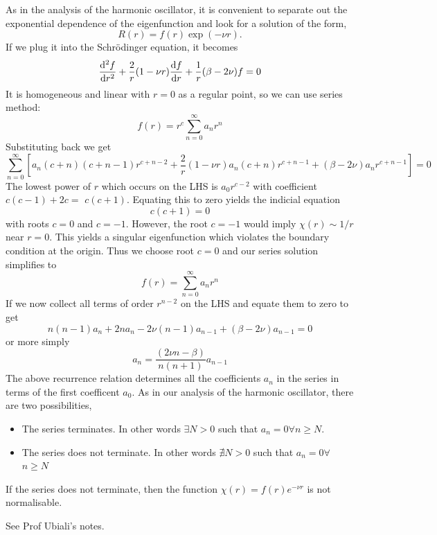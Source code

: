 \documentclass[a4paper]{article}
\begin{document}
As in the analysis of the harmonic oscillator, it is convenient to separate out the exponential dependence of the eigenfunction and look for a solution of the form,
\[
R(r)=f(r) \exp (-\nu r) .
\]
If we plug it into the Schrödinger equation, it becomes
\[
\frac{\mathrm{d}^2 f}{\mathrm{d} r^2}+\frac{2}{r}(1-\nu r) \frac{\mathrm{d} f}{\mathrm{d} r}+\frac{1}{r}(\beta-2 \nu) f=0
\]
It is homogeneous and linear with $r=0$ as a regular point, so we can use series method:
\[
	f(r)=r^c \sum_{n=0}^{\infty} a_n r^n
\]
Substituting back we get 
\[
	\sum_{n=0}^{\infty}\left[a_n(c+n)(c+n-1) r^{c+n-2}+\frac{2}{r}(1-\nu r) a_n(c+n) r^{c+n-1}+(\beta-2 \nu) a_n r^{c+n-1}\right]=0
\]
The lowest power of $r$ which occurs on the LHS is $a_0 r^{c-2}$ with coefficient $c(c-1)+2 c=$ $c(c+1)$. Equating this to zero yields the indicial equation
\[
c(c+1)=0
\]
with roots $c=0$ and $c=-1$. However, the root ${c}=-1$ would imply $\chi(r) \sim 1 / r$ near $r=0$. This yields a singular eigenfunction which violates the boundary condition at the origin. Thus we choose root $c=0$ and our series solution simplifies to
\[
f(r)=\sum_{n=0}^{\infty} a_n r^n
\]
If we now collect all terms of order $r^{n-2}$ on the LHS and equate them to zero to get
\[
n(n-1) a_n+2 n a_n-2 \nu(n-1) a_{n-1}+(\beta-2 \nu) a_{n-1}=0
\]
or more simply
\[
a_n=\frac{(2 \nu n-\beta)}{n(n+1)} a_{n-1}
\]
The above recurrence relation determines all the coefficients $a_n$ in the series in terms of the first coefficent $a_0$. As in our analysis of the harmonic oscillator, there are two possibilities,
\begin{itemize}
	\item The series terminates. In other words $\exists N>0$ such that $a_n=0 \forall n \geq N$.
	\item The series does not terminate. In other words $\nexists N>0$ such that $a_n=0 \forall$ $n \geq N$
\end{itemize}
\begin{proposition}
	If the series does not terminate, then the function $ \chi(r) = f(r) e^{-\nu r} $ is not normalisable.
\end{proposition}
See Prof Ubiali's notes. 
\end{document}
